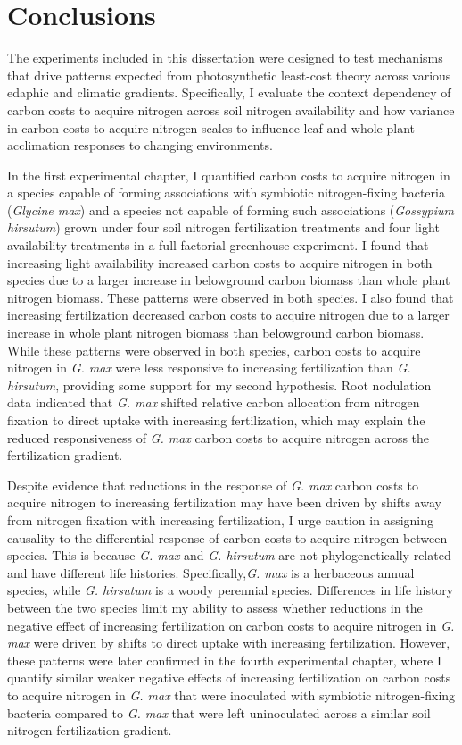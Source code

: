 \chapter{\textbf{Conclusions}}
\noindent The experiments included in this dissertation were designed to test mechanisms that drive patterns expected from photosynthetic least-cost theory across various edaphic and climatic gradients. Specifically, I evaluate the context dependency of carbon costs to acquire nitrogen across soil nitrogen availability and how variance in carbon costs to acquire nitrogen scales to influence leaf and whole plant acclimation responses to changing environments.

In the first experimental chapter, I quantified carbon costs to acquire nitrogen in a species capable of forming associations with symbiotic nitrogen-fixing bacteria (\textit{Glycine max}) and a species not capable of forming such associations (\textit{Gossypium hirsutum}) grown under four soil nitrogen fertilization treatments and four light availability treatments in a full factorial greenhouse experiment. I found that increasing light availability increased carbon costs to acquire nitrogen in both species due to a larger increase in belowground carbon biomass than whole plant nitrogen biomass. These patterns were observed in both species. I also found that increasing fertilization decreased carbon costs to acquire nitrogen due to a larger increase in whole plant nitrogen biomass than belowground carbon biomass. While these patterns were observed in both species, carbon costs to acquire nitrogen in \textit{G. max} were less responsive to increasing fertilization than \textit{G. hirsutum}, providing some support for my second hypothesis. Root nodulation data indicated that \textit{G. max} shifted relative carbon allocation from nitrogen fixation to direct uptake with increasing fertilization, which may explain the reduced responsiveness of \textit{G. max} carbon costs to acquire nitrogen across the fertilization gradient. 

Despite evidence that reductions in the response of \textit{G. max} carbon costs to acquire nitrogen to increasing fertilization may have been driven by shifts away from nitrogen fixation with increasing fertilization, I urge caution in assigning causality to the differential response of carbon costs to acquire nitrogen between species. This is because \textit{G. max} and \textit{G. hirsutum} are not phylogenetically related and have different life histories. Specifically,\textit{G. max} is a herbaceous annual species, while \textit{G. hirsutum} is a woody perennial species. Differences in life history between the two species limit my ability to assess whether reductions in the negative effect of increasing fertilization on carbon costs to acquire nitrogen in \textit{G. max} were driven by shifts to direct uptake with increasing fertilization. However, these patterns were later confirmed in the fourth experimental chapter, where I quantify similar weaker negative effects of increasing fertilization on carbon costs to acquire nitrogen in \textit{G. max} that were inoculated with symbiotic nitrogen-fixing bacteria compared to \textit{G. max} that were left uninoculated across a similar soil nitrogen fertilization gradient.

